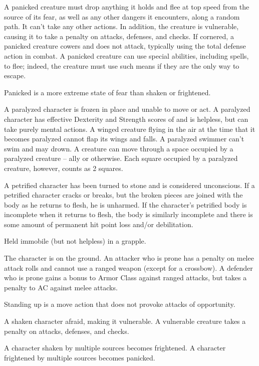 A panicked creature must drop anything it holds and flee at top speed from the source of its fear, as well as any other dangers it encounters, along a random path. It can't take any other actions. In addition, the creature is vulnerable, causing it to take a  penalty on attacks, defenses, and checks. If cornered, a panicked creature cowers and does not attack, typically using the total defense action in combat. A panicked creature can use special abilities, including spells, to flee; indeed, the creature must use such means if they are the only way to escape.

Panicked is a more extreme state of fear than shaken or frightened.

 A paralyzed character is frozen in place and unable to move or act. A paralyzed character has effective Dexterity and Strength scores of  and is helpless, but can take purely mental actions. A winged creature flying in the air at the time that it becomes paralyzed cannot flap its wings and falls. A paralyzed swimmer can't swim and may drown. A creature can move through a space occupied by a paralyzed creature -- ally or otherwise. Each square occupied by a paralyzed creature, however, counts as 2 squares.

 A petrified character has been turned to stone and is considered unconscious. If a petrified character cracks or breaks, but the broken pieces are joined with the body as he returns to flesh, he is unharmed. If the character's petrified body is incomplete when it returns to flesh, the body is similarly incomplete and there is some amount of permanent hit point loss and/or debilitation.

 Held immobile (but not helpless) in a grapple.

 The character is on the ground. An attacker who is prone has a  penalty on melee attack rolls and cannot use a ranged weapon (except for a crossbow). A defender who is prone gains a  bonus to Armor Class against ranged attacks, but takes a  penalty to AC against melee attacks.

Standing up is a move action that does not provoke attacks of opportunity.

 A shaken character afraid, making it vulnerable. A vulnerable creature takes a  penalty on attacks, defenses, and checks.

A character shaken by multiple sources becomes frightened. A character frightened by multiple sources becomes panicked.

